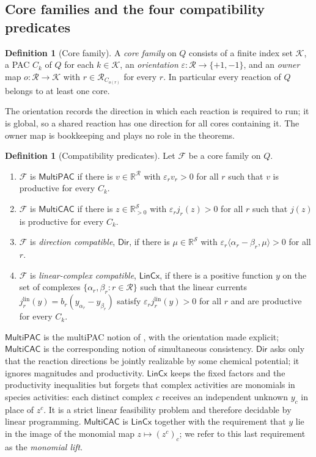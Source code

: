 \documentclass[11pt,a4paper]{article}
\theoremstyle{plain}
\theoremstyle{definition}
\newtheorem{definition}[theorem]{Definition}
\theoremstyle{remark}
\newcommand{\R}{\mathbb{R}}
\newcommand{\Rpos}{\R_{>0}}
\newcommand{\cS}{\mathcal{S}}
\newcommand{\cR}{\mathcal{R}}
\newcommand{\cK}{\mathcal{K}}
\newcommand{\cF}{\mathcal{F}}
\newcommand{\MPAC}{\mathsf{MultiPAC}}
\newcommand{\MCAC}{\mathsf{MultiCAC}}
\newcommand{\DIR}{\mathsf{Dir}}
\newcommand{\LIN}{\mathsf{LinCx}}
\begin{document}
\subsection{Core families and the four compatibility predicates}

\begin{definition}[Core family]\label{def:family}
A \emph{core family} on $Q$ consists of a finite index set $\cK$, a PAC $C_k$ of $Q$ for each $k\in\cK$, an \emph{orientation} $\varepsilon:\cR\to\{+1,-1\}$, and an \emph{owner} map $o:\cR\to\cK$ with $r\in\cR_{C_{o(r)}}$ for every $r$. In particular every reaction of $Q$ belongs to at least one core.
\end{definition}

The orientation records the direction in which each reaction is required to run; it is global, so a shared reaction has one direction for all cores containing it. The owner map is bookkeeping and plays no role in the theorems.

\begin{definition}[Compatibility predicates]\label{def:predicates}
Let $\cF$ be a core family on $Q$.
\begin{enumerate}[label=(\roman*)]
\item $\cF$ is $\MPAC$ if there is $v\in\R^{\cR}$ with $\varepsilon_rv_r>0$ for all $r$ such that $v$ is productive for every $C_k$.
\item $\cF$ is $\MCAC$ if there is $z\in\Rpos^{\cS}$ with $\varepsilon_rj_r(z)>0$ for all $r$ such that $j(z)$ is productive for every $C_k$.
\item $\cF$ is \emph{direction compatible}, $\DIR$, if there is $\mu\in\R^{\cS}$ with $\varepsilon_r\langle\alpha_r-\beta_r,\mu\rangle>0$ for all $r$.
\item $\cF$ is \emph{linear-complex compatible}, $\LIN$, if there is a positive function $y$ on the set of complexes $\{\alpha_r,\beta_r:r\in\cR\}$ such that the linear currents $j^{\mathrm{lin}}_r(y)=b_r(y_{\alpha_r}-y_{\beta_r})$ satisfy $\varepsilon_rj^{\mathrm{lin}}_r(y)>0$ for all $r$ and are productive for every $C_k$.
\end{enumerate}
\end{definition}

$\MPAC$ is the multiPAC notion of \citep{kosc2025}, with the orientation made explicit; $\MCAC$ is the corresponding notion of simultaneous consistency. $\DIR$ asks only that the reaction directions be jointly realizable by some chemical potential; it ignores magnitudes and productivity. $\LIN$ keeps the fixed factors and the productivity inequalities but forgets that complex activities are monomials in species activities: each distinct complex $c$ receives an independent unknown $y_c$ in place of $z^{c}$. It is a strict linear feasibility problem and therefore decidable by linear programming. $\MCAC$ is $\LIN$ together with the requirement that $y$ lie in the image of the monomial map $z\mapsto(z^{c})_c$; we refer to this last requirement as the \emph{monomial lift}.
\end{document}
